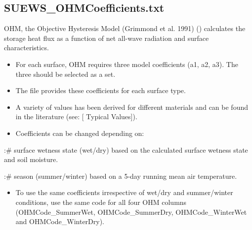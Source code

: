 \documentclass[letterpaper,10pt,english]{sphinxmanual}
\begin{document}
\subsection{SUEWS\_OHMCoefficients.txt}
\label{\detokenize{input_files/SUEWS_SiteInfo/SUEWS_OHMCoefficients::doc}}\label{\detokenize{input_files/SUEWS_SiteInfo/SUEWS_OHMCoefficients:suews-ohmcoefficients-txt}}\label{\detokenize{input_files/SUEWS_SiteInfo/SUEWS_OHMCoefficients:id1}}
OHM, the Objective Hysteresis Model (Grimmond et al. 1991) \label{\detokenize{input_files/SUEWS_SiteInfo/SUEWS_OHMCoefficients:id2}}{\hyperref[\detokenize{references:g91ohm}]{\sphinxcrossref{{[}G91OHM{]}}}} ()
calculates the storage heat flux as a function of net all-wave radiation
and surface characteristics.
\begin{itemize}
\item {} 
For each surface, OHM requires three model coefficients (a1, a2, a3).
The three should be selected as a set.

\item {} 
The  file provides these coefficients
for each surface type.

\item {} 
A variety of values has been derived for different materials and can
be found in the literature (see:
{[}\textbar{}
Typical Values{]}).

\item {} 
Coefficients can be changed depending on:

\end{itemize}

:\# surface wetness state (wet/dry) based on the calculated surface
wetness state and soil moisture.

:\# season (summer/winter) based on a 5-day running mean air temperature.
\begin{itemize}
\item {} 
To use the same coefficients irrespective of wet/dry and
summer/winter conditions, use the same code for all four OHM columns
(OHMCode\_SummerWet, OHMCode\_SummerDry, OHMCode\_WinterWet and
OHMCode\_WinterDry).

\end{itemize}
\end{document}

